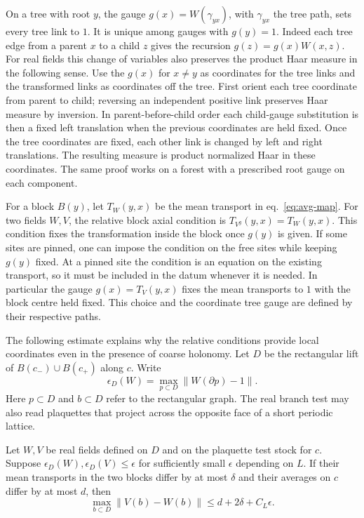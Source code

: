 \documentclass[11pt,letterpaper,reqno]{amsart}
\makeatletter
\numberwithin{equation}{section}
\renewcommand{\eqref}[1]{\textup{eq.~\ref{#1}}}
\theoremstyle{definition}
\newcommand{\ms@minorstart}{%
  \pushQED{\qed}\renewcommand{\qedsymbol}{$\blacksquare$}}
\newenvironment{lemma}[1][]{\ms@minorstart\ms@lemma[#1]}
  {\popQED\endms@lemma}
\theoremstyle{remark}
\makeatother
\begin{document}
On a tree with root \(y\), the gauge \(g(x)=W(\gamma_{yx})\), with
\(\gamma_{yx}\) the tree path, sets every tree link to \(1\). It is unique
among gauges with \(g(y)=1\). Indeed each tree edge from a parent \(x\)
to a child \(z\) gives the recursion \(g(z)=g(x)W(x,z)\).
For real fields this change of variables also preserves the product
Haar measure in the following sense. Use the \(g(x)\) for \(x\ne y\) as
coordinates for the tree links and the transformed links as coordinates
off the tree. First orient each tree coordinate from parent to child;
reversing an independent positive link preserves Haar measure by inversion.
In parent-before-child order each child-gauge substitution is then a
fixed left translation when the previous coordinates are held fixed.
Once the tree coordinates are fixed, each other link is changed by left
and right translations. The resulting measure is product normalized Haar
in these coordinates. The same proof works on a forest with a prescribed
root gauge on each component.

For a block \(B(y)\), let \(T_W(y,x)\) be the mean transport in
\eqref{eq:avg-map}. For two fields \(W,V\), the relative block axial
condition is \(T_{V^g}(y,x)=T_W(y,x)\). This condition fixes the
transformation inside the block once \(g(y)\) is given. If some sites are
pinned, one can impose the condition on the free sites while keeping
\(g(y)\) fixed. At a pinned site the condition is an equation on the
existing transport, so it must be included in the datum whenever it is
needed. In particular the gauge \(g(x)=T_V(y,x)\) fixes the mean
transports to \(1\) with the block centre held fixed. This choice and
the coordinate tree gauge are defined by their respective paths.

The following estimate explains why the relative conditions provide
local coordinates even in the presence of coarse holonomy. Let \(D\)
be the rectangular lift of \(B(c_-)\cup B(c_+)\) along \(c\).
Write
\[
  \epsilon_D(W)=\max_{p\subset D}\|W(\partial p)-1\|.
\]
Here \(p\subset D\) and \(b\subset D\) refer to the rectangular
graph. The real branch test may also read plaquettes that project
across the opposite face of a short periodic lattice.

\begin{lemma}[Relative transport estimate]\label{lem:gauge-rigidity}
Let \(W,V\) be real fields defined on \(D\) and on the plaquette
test stock for \(c\). Suppose
\(\epsilon_D(W),\epsilon_D(V)\le\epsilon\) for sufficiently small
\(\epsilon\) depending on \(L\). If their mean transports in the two
blocks differ by at most \(\delta\) and their averages on \(c\)
differ by at most \(d\), then
\[
 \max_{b\subset D}\|V(b)-W(b)\|\le d+2\delta+C_L\epsilon .
\]
\end{lemma}
\end{document}
